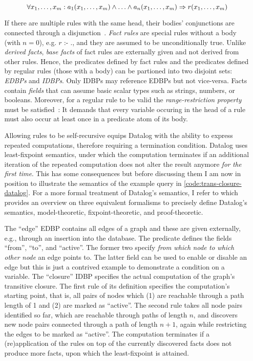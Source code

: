 \begin{equation}
	\forall x_1, \ldots, x_m: a_1(x_1, \ldots, x_m) \land \ldots \land a_n(x_1, \ldots, x_m) \Rightarrow r(x_1, \ldots, x_m) \\
\end{equation}

If there are multiple rules with the same head, their bodies' conjunctions
are connected through a disjunction~\cite{abo2024convergence}.
\emph{Fact rules} are special rules without a body (with $n=0$), e.g.
\( r \text{ :- } .\), and they are assumed to be unconditionally true.
Unlike \emph{derived facts}, \emph{base facts} of fact rules are externally
given and not derived from other rules.
Hence, the predicates defined by fact rules and the predicates defined by regular
rules (those with a body) can be partioned into two disjoint sets:
\emph{\acfp{EDBP}} and \emph{\acfp{IDBP}}. Only \acp{IDBP} may reference \acp{EDBP}
but not vice-versa.
Facts contain \emph{fields} that can assume basic scalar types such as strings,
numbers, or booleans.
Moreover, for a regular rule to be valid the \emph{range-restriction property}
must be satisfied~\cite{green2013datalog}:
It demands that every variable occuring in the head of a rule must also occur
at least once in a predicate atom of its body.

Allowing rules to be self-recursive equips Datalog with the ability to express
repeated computations, therefore requiring a termination condition.
Datalog uses least-fixpoint semantics, under which the computation terminates
if an additional iteration of the repeated computation does not alter the result
anymore \emph{for the first time}.
This has some consequences but before discussing them I am now in position
to illustrate the semantics of the example query in \ref{code:trans-closure-datalog}.
For a more formal treatment of Datalog's semantics, I refer to \cite{green2013datalog}
which provides an overview on three equivalent formalisms to precisely define
Datalog's semantics, model-theoretic, fixpoint-theoretic, and proof-theoretic.

The ``edge'' \ac{EDBP} contains all edges of a graph and these are given
externally, e.g., through an insertion into the database.
The predicate defines the fields ``from'', ``to'', and ``active''.
The former two specify \emph{from which node to which other node} an edge points to.
The latter field can be used to enable or disable an edge but this is just
a contrived example to demonstrate a condition on a variable.
The ``closure'' \ac{IDBP} specifies the actual computation of the graph's
transitive closure.
The first rule of its definition specifies the computation's starting point,
that is, all pairs of nodes which (1) are reachable through a path length of 1
and (2) are marked as ``active''.
The second rule takes all node pairs identified so far, which are reachable
through paths of length \(n\), and discovers new node pairs connected
through a path of length \(n + 1\),
again while restricting the edges to be marked as ``active''.
The computation terminates if a (re)application of the rules on top of the
currently discovered facts does not produce more facts,
upon which the least-fixpoint is attained.

